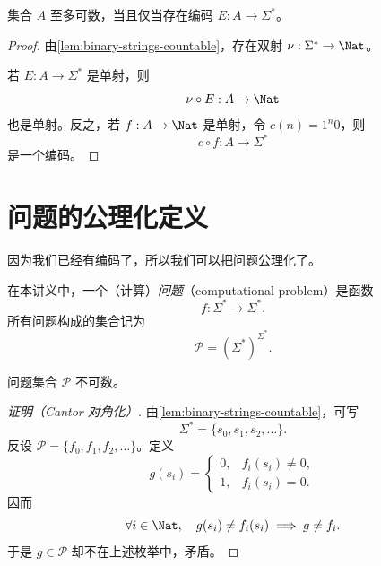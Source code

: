 \begin{theorem}[可编码性与可数性]
  \label{thm:encodable-iff-countable}
  集合 $A$ 至多可数，当且仅当存在编码 $E:A\to\Sigma^*$。
\end{theorem}

\begin{proof}
  由\cref{lem:binary-strings-countable}，存在双射
  $\nu:\Sigma^*\to\Nat$。

  若 $E:A\to\Sigma^*$ 是单射，则
  \[
    \nu\circ E:A\to\Nat
  \]
  也是单射。反之，若 $f:A\to\Nat$ 是单射，令 $c(n)=1^n0$，则
  \[
    c\circ f:A\to\Sigma^*
  \]
  是一个编码。
\end{proof}

\section{问题的公理化定义}

因为我们已经有编码了，所以我们可以把问题公理化了。

\begin{definition}[问题]
  \label{def:problem}
  在本讲义中，一个（计算）\emph{问题}（computational problem）是函数
  \[
    f:\Sigma^*\longrightarrow\Sigma^*.
  \]
  所有问题构成的集合记为
  \[
    \mathcal{P}=(\Sigma^*)^{\Sigma^*}.
  \]
\end{definition}

\begin{theorem}
  \label{thm:problems-uncountable}
  问题集合 $\mathcal{P}$ 不可数。
\end{theorem}

\begin{proof}[证明（Cantor 对角化）]
  由\cref{lem:binary-strings-countable}，可写
  \[
    \Sigma^*=\{s_0,s_1,s_2,\ldots\}.
  \]
  反设 $\mathcal P=\{f_0,f_1,f_2,\ldots\}$。定义
  \[
    g(s_i)=
    \begin{cases}
      0, & f_i(s_i)\neq 0,\\
      1, & f_i(s_i)=0.
    \end{cases}
  \]
  因而
  \[
    \forall i\in\Nat,\quad g(s_i)\neq f_i(s_i)
    \implies g\neq f_i.
  \]
  于是 $g\in\mathcal P$ 却不在上述枚举中，矛盾。
\end{proof}
